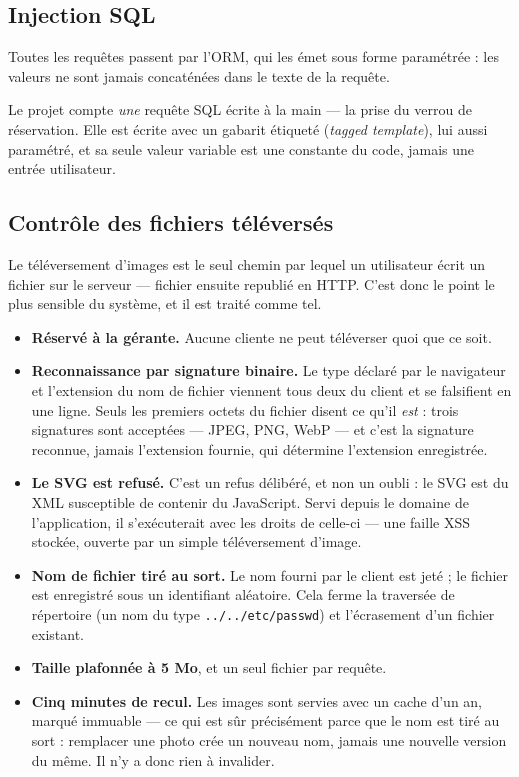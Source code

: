 \subsection{Injection SQL}

Toutes les requêtes passent par l'ORM, qui les émet sous forme paramétrée :
les valeurs ne sont jamais concaténées dans le texte de la requête.

Le projet compte \emph{une} requête SQL écrite à la main --- la prise du verrou
de réservation. Elle est écrite avec un gabarit étiqueté (\textit{tagged
template}), lui aussi paramétré, et sa seule valeur variable est une constante
du code, jamais une entrée utilisateur.

\subsection{Contrôle des fichiers téléversés}

Le téléversement d'images est le seul chemin par lequel un utilisateur écrit un
fichier sur le serveur --- fichier ensuite republié en HTTP. C'est donc le
point le plus sensible du système, et il est traité comme tel.

\begin{itemize}[leftmargin=1.2cm]
  \item \textbf{Réservé à la gérante.} Aucune cliente ne peut téléverser quoi
  que ce soit.

  \item \textbf{Reconnaissance par signature binaire.} Le type déclaré par le
  navigateur et l'extension du nom de fichier viennent tous deux du client et
  se falsifient en une ligne. Seuls les premiers octets du fichier disent ce
  qu'il \emph{est} : trois signatures sont acceptées --- JPEG, PNG, WebP ---
  et c'est la signature reconnue, jamais l'extension fournie, qui détermine
  l'extension enregistrée.

  \item \textbf{Le SVG est refusé.} C'est un refus délibéré, et non un oubli :
  le SVG est du XML susceptible de contenir du JavaScript. Servi depuis le
  domaine de l'application, il s'exécuterait avec les droits de celle-ci ---
  une faille XSS stockée, ouverte par un simple téléversement d'image.

  \item \textbf{Nom de fichier tiré au sort.} Le nom fourni par le client est
  jeté ; le fichier est enregistré sous un identifiant aléatoire. Cela ferme la
  traversée de répertoire (un nom du type \texttt{../../etc/passwd}) et
  l'écrasement d'un fichier existant.

  \item \textbf{Taille plafonnée à 5 Mo}, et un seul fichier par requête.

  \item \textbf{Cinq minutes de recul.} Les images sont servies avec un cache
  d'un an, marqué immuable --- ce qui est sûr précisément parce que le nom est
  tiré au sort : remplacer une photo crée un nouveau nom, jamais une nouvelle
  version du même. Il n'y a donc rien à invalider.
\end{itemize}

